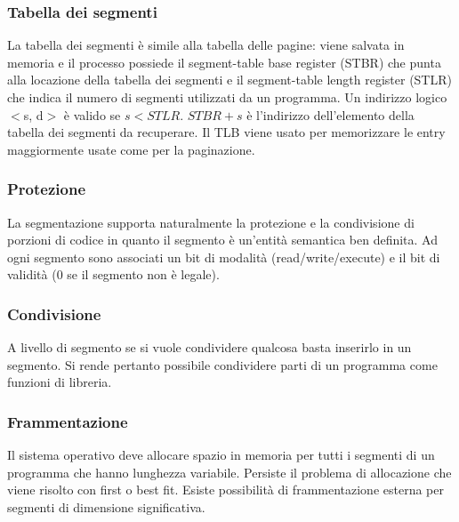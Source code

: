 \subsubsection{Tabella dei segmenti}
La tabella dei segmenti \`e simile alla tabella delle pagine: viene salvata in memoria e il processo possiede il segment-table base register (STBR) che punta alla locazione della
tabella dei segmenti e il segment-table length register (STLR) che indica il numero di segmenti utilizzati da un programma. Un indirizzo logico $<$s, d$>$ \`e valido se $s<STLR$.
$STBR+s$ \`e l'indirizzo dell'elemento della tabella dei segmenti da recuperare. Il TLB viene usato per memorizzare le entry maggiormente usate come per la paginazione. 
\subsubsection{Protezione}
La segmentazione supporta naturalmente la protezione e la condivisione di porzioni di codice in quanto il segmento \`e un'entit\`a semantica ben definita. Ad ogni segmento sono 
associati un bit di modalit\`a (read/write/execute) e il bit di validit\`a ($0$ se il segmento non \`e legale). 
\subsubsection{Condivisione}
A livello di segmento se si vuole condividere qualcosa basta inserirlo in un segmento. Si rende pertanto possibile condividere parti di un programma come funzioni di libreria.
\subsubsection{Frammentazione}
Il sistema operativo deve allocare spazio in memoria per tutti i segmenti di un programma che hanno lunghezza variabile. Persiste il problema di allocazione che viene risolto con
first o best fit. Esiste possibilit\`a di frammentazione esterna per segmenti di dimensione significativa.
